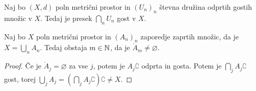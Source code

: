 
\begin{izrek}[Baire]
  Naj bo $(X, d)$ poln metrični prostor in $(U_n)_n$ števna družina odprtih
  gostih množic v $X$.
  Tedaj je presek $\bigcap_n U_n$ gost v $X$.
\end{izrek}

\begin{posledica}
  Naj bo $X$ poln metrični prostor in $(A_n)_n$ zaporedje zaprtih množic, da je
  $X = \bigcup_n A_n$.
  Tedaj obstaja $m \in \mathbb{N}$, da je $\mathring{A}_m \ne \varnothing$.
\end{posledica}

\begin{proof}
  Če je $\mathring{A}_j = \varnothing$ za vse $j$, potem je $A_j\complement$
  odprta in gosta.
  Potem je $\bigcap_j A_j\complement$ gost, torej $\bigcup_j A_j = \left(
	\bigcap_j A_j\complement \right)\complement \ne X$.
\end{proof}